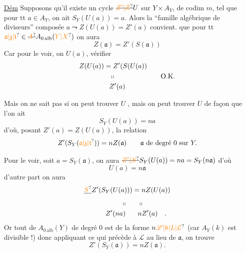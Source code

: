 \uline{Dém} Supposons qu'il existe un cycle
$\deleted{\unsure{Z'|Z}}U$ sur $Y\times A_Y$, de codim $m$, tel
que pour tt $a\in A_Y$, on ait $S_Y(U(a))=a$.
Alors la ``famille algébrique de diviseurs''
composée $a\leadsto Z(U(a))=Z'(a)$
convient.  que pour tt $\unsure{\mathfrak{a}|\mathfrak{z}|\mathfrak{t}}\in\deleted{\unsure{A}}A_{0\,\mathrm{alb}}(\unsure{Y|X})$
 on aura 
\[
Z(\mathfrak{a})=Z'(S(\mathfrak{a}))
\]
Car pour le voir, on   $U(a)$,  vérifier
\[
\begin{aligned}
Z(U(a))&=Z'(S(U(a))\\
&\phantom{=}\shortparallel\\
&\phantom{=}Z'(a)
\end{aligned}
\qquad \text{O.K.}
\]

Mais  on ne sait pas si on peut
trouver $U$ , mais on peut trouver $U$ de
façon que l'on ait
\[
S_Y(U(a))=na
\]
d'où, posant $Z'(a)=Z(U(a))$, la relation
\[
Z'(S_Y(\unsure{\mathfrak{a}|\mathfrak{z}|\mathfrak{t}}))=nZ(\mathfrak{a})\qquad \mathfrak{a}\ \text{de degré 0 sur }Y.
\]

Pour le voir, soit $a=S_Y(\mathfrak{a})$, on aura
$\deleted{\unsure{Z'(S}}S_Y(U(a))=na=S_Y(n\mathfrak{a})$ d'où 
\[
U(a)=n\mathfrak{a}
\]
d'autre part on aura
\[
\begin{aligned}
\deleted{\unsure{S}}Z'(S_Y(U(a)))&=nZ(U(a))\\
\shortparallel\quad &\phantom{=}\shortparallel\\
Z'(na)\quad &\phantom{=}nZ'(a)\quad .
\end{aligned}
\]
Or tout  de $A_{0\,\mathrm{alb}}(Y)$ de degré 0 est
de la forme $n\unsure{\mathscr L|\mathfrak b|L|\mathcal L}$ (car $A_Y(k)$ est divisible !)
donc appliquant ce qui précède à $\mathscr L$ au lieu de $\mathfrak{a}$,
on trouve
\[
Z'(S_Y(\mathfrak{a}))=nZ(\mathfrak{a}).
\]

